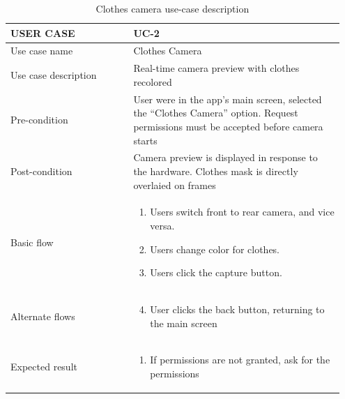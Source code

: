 \begin{center}
\begin{table} [H]
\caption{Clothes camera use-case description} 
\begin{tabular}{p{0.35\linewidth} | p{0.6\linewidth}}
\hline
USER CASE            & UC-2 \\ \hline
Use case name        & Clothes Camera  \\ \hline
Use case description & Real-time camera preview with clothes recolored     \\ \hline
Pre-condition         &   User were in the app's main screen, selected the “Clothes Camera” option. Request permissions must be accepted before camera starts   \\ \hline
Post-condition        &   Camera preview is displayed in response to the hardware. Clothes mask is directly overlaied on frames   \\ \hline
Basic flow           &  \begin{enumerate}
  \item Users switch front to rear camera, and vice versa.
  \item Users change color for clothes.
  \item	Users click the capture button. 
\end{enumerate} \\ \hline
Alternate flows      &   \begin{enumerate}
    \setcounter{enumi}{3}
    \item User clicks the back button, returning to the main screen
\end{enumerate}   \\ \hline
Expected result      &  \begin{enumerate}
    \item If permissions are not granted, ask for the permissions
\end{enumerate}    \\ \hline
\end{tabular}
\end{table}
\end{center}


